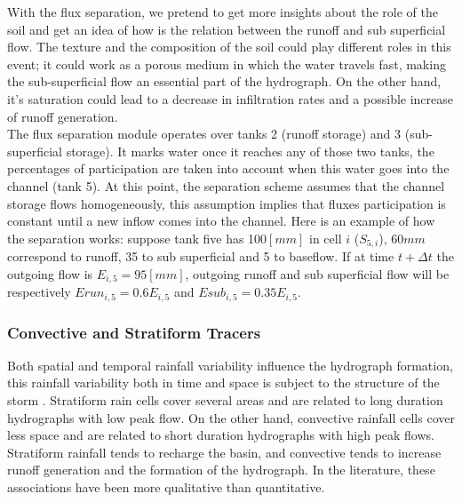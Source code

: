 {With the flux separation, we pretend to get more insights about the role of the soil and get an idea of how is the relation between the runoff and sub superficial flow.  The texture and the composition of the soil could play different roles in this event; it could work as a porous medium in which the water travels fast, making the sub-superficial flow an essential part of the hydrograph.  On the other hand, it's saturation could lead to a decrease in infiltration rates and a possible increase of runoff generation.\\

The flux separation module operates over tanks 2 (runoff storage) and 3 (sub-superficial storage).  It marks water once it reaches any of those two tanks, the percentages of participation are taken into account when this water goes into the channel (tank 5).   At this point, the separation scheme assumes that the channel storage flows homogeneously,  this assumption implies that fluxes participation is constant until a new inflow comes into the channel.  Here is an example of how the separation works: suppose tank five has 100$[mm]$ in cell $i$ ($S_{5,i}$), 60$mm$ correspond to runoff, 35 to sub superficial and 5 to baseflow.  If at time $t+\Delta t$ the outgoing flow is $E_{i,5} = 95[mm]$, outgoing runoff and sub superficial flow will be respectively $Erun_{i,5} = 0.6 E_{i,5}$ and $Esub_{i,5} = 0.35E_{i,5}$.\\     

\subsubsection{Convective and Stratiform Tracers}

Both spatial and temporal rainfall variability influence the hydrograph formation, this rainfall variability both in time and space is subject to the structure of the storm \citet{Shope2016}. Stratiform rain cells cover several areas and are related to long duration hydrographs with low peak flow.  On the other hand, convective rainfall cells cover less space and are related to short duration hydrographs with high peak flows.  Stratiform rainfall tends to recharge the basin, and convective tends to increase runoff generation and the formation of the hydrograph.  In the literature, these associations have been more qualitative than quantitative.\\

}
